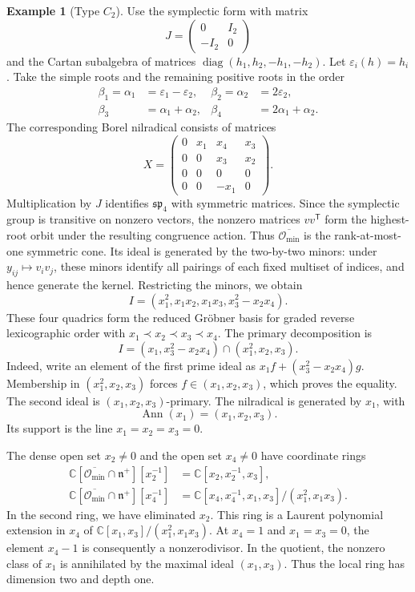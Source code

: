 \documentclass[12pt]{article}
\theoremstyle{definition}
\newtheorem{example}[theorem]{Example}
\newcommand{\C}{\mathbb C}
\newcommand{\n}{\mathfrak n^{+}}
\newcommand{\oc}{\overline{\mathcal O_{\min}}}
\begin{document}
\begin{example}[Type $C_2$]
    Use the symplectic form with matrix
    $$
        J=\begin{pmatrix}0&I_2\\-I_2&0\end{pmatrix}
    $$
    and the Cartan subalgebra of matrices $\operatorname{diag}(h_1,h_2,-h_1,-h_2)$. Let $\varepsilon_i(h)=h_i$. Take the simple roots and the remaining positive roots in the order
    \begin{align*}
        \beta_1=\alpha_1&=\varepsilon_1-\varepsilon_2,
        &\beta_2=\alpha_2&=2\varepsilon_2,\\
        \beta_3&=\alpha_1+\alpha_2,
        &\beta_4&=2\alpha_1+\alpha_2.
    \end{align*}
    The corresponding Borel nilradical consists of matrices
    $$
        X=\begin{pmatrix}
            0&x_1&x_4&x_3\\
            0&0&x_3&x_2\\
            0&0&0&0\\
            0&0&-x_1&0
        \end{pmatrix}.
    $$
    Multiplication by $J$ identifies $\mathfrak{sp}_4$ with symmetric matrices. Since the symplectic group is transitive on nonzero vectors, the nonzero matrices $vv^{\mathsf T}$ form the highest-root orbit under the resulting congruence action. Thus $\oc$ is the rank-at-most-one symmetric cone. Its ideal is generated by the two-by-two minors: under $y_{ij}\mapsto v_iv_j$, these minors identify all pairings of each fixed multiset of indices, and hence generate the kernel. Restricting the minors, we obtain
    $$
        I=(x_1^2,x_1x_2,x_1x_3,x_3^2-x_2x_4).
    $$
    These four quadrics form the reduced Gr\"obner basis for graded reverse lexicographic order with $x_1\prec x_2\prec x_3\prec x_4$. The primary decomposition is
    $$
        I=(x_1,x_3^2-x_2x_4)\cap(x_1^2,x_2,x_3).
    $$
    Indeed, write an element of the first prime ideal as $x_1f+(x_3^2-x_2x_4)g$. Membership in $(x_1^2,x_2,x_3)$ forces $f\in(x_1,x_2,x_3)$, which proves the equality. The second ideal is $(x_1,x_2,x_3)$-primary. The nilradical is generated by $x_1$, with
    $$
        \operatorname{Ann}(x_1)=(x_1,x_2,x_3).
    $$
    Its support is the line $x_1=x_2=x_3=0$.

    The dense open set $x_2\ne0$ and the open set $x_4\ne0$ have coordinate rings
    \begin{align*}
        \C[\oc\cap\n][x_2^{-1}]&=\C[x_2,x_2^{-1},x_3],\\
        \C[\oc\cap\n][x_4^{-1}]&=\C[x_4,x_4^{-1},x_1,x_3]/(x_1^2,x_1x_3).
    \end{align*}
    In the second ring, we have eliminated $x_2$. This ring is a Laurent polynomial extension in $x_4$ of $\C[x_1,x_3]/(x_1^2,x_1x_3)$. At $x_4=1$ and $x_1=x_3=0$, the element $x_4-1$ is consequently a nonzerodivisor. In the quotient, the nonzero class of $x_1$ is annihilated by the maximal ideal $(x_1,x_3)$. Thus the local ring has dimension two and depth one.
\end{example}
\end{document}
